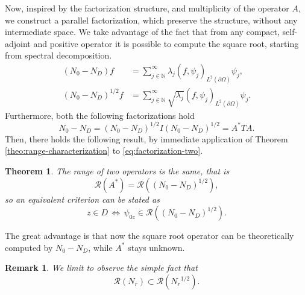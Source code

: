\documentclass[10pt, a4paper, twoside, openright]{book}
\theoremstyle{definition}
\theoremstyle{plain}
\newtheorem{theorem}[subsection]{Theorem}
\theoremstyle{plain}
\theoremstyle{plain}
\theoremstyle{plain}
\newtheorem{remark}[subsection]{Remark}
\theoremstyle{plain}
\theoremstyle{plain}
\theoremstyle{plain}
\theoremstyle{plain}
\begin{document}
Now, inspired  by the factorization structure, and multiplicity of the operator $A$, 
we construct a parallel factorization, which preserve the structure, without any intermediate space.
We take advantage of the fact that from any compact, self-adjoint and positive operator 
it is possible to compute the square root, starting from spectral decomposition.
\begin{align}
({N_0} - {N_D}) f &= \sum_{j\in \mathbb{N}}^\infty \lambda_j(f,\psi_j)_{L^2(\partial\Omega)} \psi_j ,\\
({N_0} - {N_D})^{1/2} f &= \sum_{j\in \mathbb{N}}^\infty \sqrt{\lambda_j}(f,\psi_j)_{L^2(\partial\Omega)} \psi_j.
\end{align}
Furthermore, both the following factorizations hold
\begin{equation}
\label{eq:factorization-two}
 {N_0} - {N_D}=({N_0} - {N_D})^{1/2}I({N_0} - {N_D})^{1/2} = A^*TA.
\end{equation}
Then, there holds the following result, by immediate application of Theorem \ref{theo:range-characterization} to \eqref{eq:factorization-two}.
\begin{theorem}
 The range of two operators is the same, that is
 \begin{equation}
  \mathcal{R}(A^*) = \mathcal{R}(({N_0} - {N_D})^{1/2}),
 \end{equation}
so an equivalent criterion can be stated as
 \begin{equation}
  z \in D \,\Longleftrightarrow \,\psi_{0z} \in \mathcal{R}(({N_0} - {N_D})^{1/2}).
 \end{equation}
\end{theorem}
The great advantage is that now the square root operator can be theoretically computed by ${N_0} - {N_D}$, while $A^*$ stays unknown.
\begin{remark}
 We limit to observe the simple fact that
 \begin{equation}
  \mathcal{R}({N_r}) \subset \mathcal{R}({N_r}^{1/2}).
 \end{equation}
\end{remark}
\end{document}
